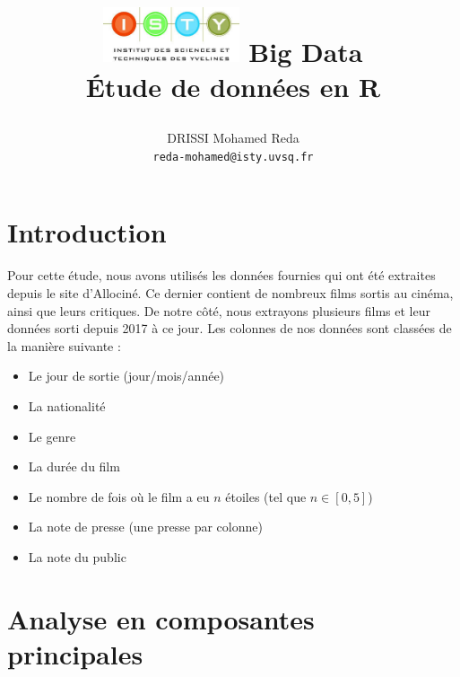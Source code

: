 \documentclass{report}
\begin{document}
\title{
  \begin{minipage}\linewidth
      \centering
      \includegraphics[width=40mm]{resources/01.png}\vskip 20pt
      \Huge Big Data \\ Étude de données en R
      \vskip 5pt
      \author{
        DRISSI Mohamed Reda \\
        \texttt{reda-mohamed@isty.uvsq.fr}
      }
    \end{minipage}
}
\maketitle
\newpage
\tableofcontents
\newpage
\section{Introduction}
Pour cette étude, nous avons utilisés les données fournies qui ont été extraites depuis le site
d’Allociné. Ce dernier contient de nombreux films sortis au cinéma, ainsi que leurs critiques. De notre côté,
nous extrayons plusieurs films et leur données sorti depuis 2017 à ce jour. Les colonnes de nos données
sont classées de la manière suivante :
\begin{itemize}
  \item Le jour de sortie (jour/mois/année)
  \item La nationalité
  \item Le genre
  \item La durée du film
  \item Le nombre de fois où le film a eu $n$ étoiles (tel que $n \in [0,5]$)
  \item La note de presse (une presse par colonne)
  \item La note du public
\end{itemize}
\section{Analyse en composantes principales}
\end{document}
